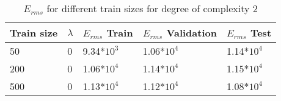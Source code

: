 \def\arraystretch{1.25}
\begin{table}[H]
\centering
\begin{tabular}{l l l l l}
\hline
\hline
\textbf{Train size} & \textbf{$\lambda$} & \textbf{$E_{rms}$ Train} & \textbf{$E_{rms}$ Validation} & \textbf{$E_{rms}$ Test}\\
\hline
\hline
50 & 0 & 9.34*$10^3$ & 1.06*$10^4$ & 1.14*$10^4$  \\
200 & 0 & 1.06*$10^4$ & 1.14*$10^4$ & 1.15*$ 10^4$  \\
500 & 0 & 1.13*$10^4$ & 1.12*$10^4$ & 1.08*$10^4$\\
\hline
\end{tabular}
\caption{$E_{rms}$ for different train sizes for degree of complexity 2}
\end{table}
